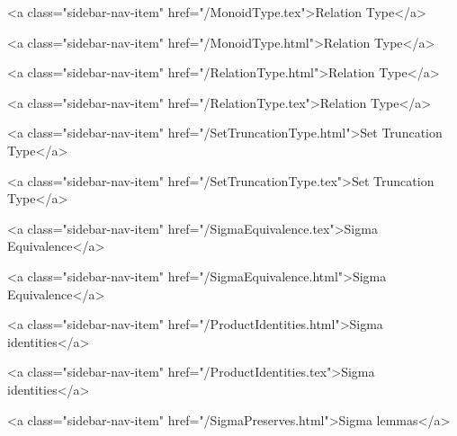       
    
      
        
          <a class="sidebar-nav-item" href="/MonoidType.tex">Relation Type</a>
        
      
    
      
        
          <a class="sidebar-nav-item" href="/MonoidType.html">Relation Type</a>
        
      
    
      
        
          <a class="sidebar-nav-item" href="/RelationType.html">Relation Type</a>
        
      
    
      
        
          <a class="sidebar-nav-item" href="/RelationType.tex">Relation Type</a>
        
      
    
      
        
          <a class="sidebar-nav-item" href="/SetTruncationType.html">Set Truncation Type</a>
        
      
    
      
        
          <a class="sidebar-nav-item" href="/SetTruncationType.tex">Set Truncation Type</a>
        
      
    
      
        
          <a class="sidebar-nav-item" href="/SigmaEquivalence.tex">Sigma Equivalence</a>
        
      
    
      
        
          <a class="sidebar-nav-item" href="/SigmaEquivalence.html">Sigma Equivalence</a>
        
      
    
      
        
          <a class="sidebar-nav-item" href="/ProductIdentities.html">Sigma identities</a>
        
      
    
      
        
          <a class="sidebar-nav-item" href="/ProductIdentities.tex">Sigma identities</a>
        
      
    
      
        
          <a class="sidebar-nav-item" href="/SigmaPreserves.html">Sigma lemmas</a>
        
